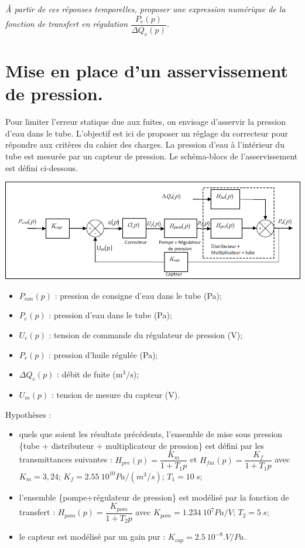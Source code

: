 \documentclass[10pt,fleqn]{article} %
\begin{document}
\begin{multicols}{2}
\subparagraph{}
\textit{À partir de ces réponses temporelles, proposer une expression numérique de la fonction de transfert en régulation $\dfrac{P_e(p)}{\Delta Q_e(p)}$.}

\section*{Mise en place d'un asservissement de pression.}
Pour limiter l’erreur statique due aux fuites, on envisage d’asservir la pression d’eau dans le tube. L’objectif est ici de proposer un réglage du correcteur pour répondre aux critères du cahier des charges.
La pression d’eau à l’intérieur du tube est mesurée par un capteur de pression. Le schéma-blocs de l’asservissement est défini ci-dessous.

\begin{center}
\includegraphics[width=\linewidth]{images_02/fig_06}
\end{center}

\begin{itemize}
\item $P_{con}(p)$ 	: 	pression de consigne d’eau dans le tube (Pa);
\item $P_e(p)$ 	:	pression d’eau dans le tube (Pa);
\item $U_c(p)$ 	: 	tension de commande du régulateur de pression (V);
\item $P_r(p)$ 	:	pression d’huile régulée (Pa);
\item $\Delta Q_e(p)$ 	:	débit de fuite ($\text{m}^3/\text{s}$);
\item $U_m(p)$ 	:	tension de mesure du capteur (V).
\end{itemize}

Hypothèses : 
\begin{itemize}
\item quels que soient les résultats précédents, l’ensemble de mise sous pression \{tube + distributeur + multiplicateur de pression\} est défini par les transmittances suivantes :
$H_{pre} (p)=\dfrac{K_m}{1+T_1 p}$ et $H_{fui} (p)=\dfrac{K_f}{1+T_1 p}$
avec $K_m = 3,24$; $K_f = \SI{2,55}{10^{10} Pa/(m^3/s)}$; $T_1  =\SI{10}{s}$; 
\item l’ensemble \{pompe+régulateur de pression\} est modélisé par la fonction de transfert :
$H_{pom} (p)=\dfrac{K_{pom}}{1+T_2 p}$ avec $K_{pom} = \SI{1,234}{10^7 Pa/V}$; 	$T_2 = \SI{5}{s}$;
\item le capteur est modélisé par un gain pur :	$K_{cap}= \SI{2,5}{10^{-8}.V/Pa}$.
\end{itemize}


\end{multicols}
\end{document}
